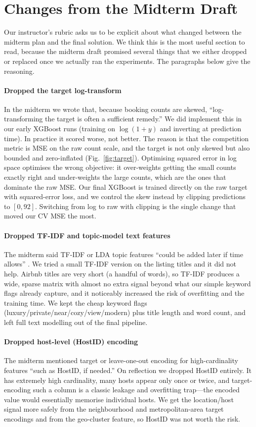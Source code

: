 \documentclass[journal]{IEEEtran}
\begin{document}
\section{Changes from the Midterm Draft}
\label{sec:changes}
Our instructor's rubric asks us to be explicit about what changed between the
midterm plan and the final solution. We think this is the most useful section to
read, because the midterm draft promised several things that we either dropped
or replaced once we actually ran the experiments. The paragraphs below give the
reasoning.

\paragraph{Dropped the target log-transform} In the midterm we wrote that,
because booking counts are skewed, ``log-transforming the target is often a
sufficient remedy.'' We did implement this in our early XGBoost runs (training on
$\log(1+y)$ and inverting at prediction time). In practice it scored worse, not
better. The reason is that the competition metric is MSE on the raw count scale,
and the target is not only skewed but also bounded and zero-inflated
(Fig.~\ref{fig:target}). Optimising squared error in log space optimises the
wrong objective: it over-weights getting the small counts exactly right and
under-weights the large counts, which are the ones that dominate the raw MSE. Our
final XGBoost is trained directly on the raw target with squared-error loss, and
we control the skew instead by clipping predictions to $[0,92]$. Switching from
log to raw with clipping is the single change that moved our CV MSE the most.

\paragraph{Dropped TF-IDF and topic-model text features} The midterm said TF-IDF
or LDA topic features ``could be added later if time allows'' \cite{islam2022}.
We tried a small TF-IDF version on the listing titles and it did not help. Airbnb
titles are very short (a handful of words), so TF-IDF produces a wide, sparse
matrix with almost no extra signal beyond what our simple keyword flags already
capture, and it noticeably increased the risk of overfitting and the training
time. We kept the cheap keyword flags
(luxury/private/near/cozy/view/modern) plus title length and word count, and left
full text modelling out of the final pipeline.

\paragraph{Dropped host-level (HostID) encoding} The midterm mentioned target or
leave-one-out encoding for high-cardinality features ``such as HostID, if
needed.'' On reflection we dropped HostID entirely. It has extremely high
cardinality, many hosts appear only once or twice, and target-encoding such a
column is a classic leakage and overfitting trap---the encoded value would
essentially memorise individual hosts. We get the location/host signal more
safely from the neighbourhood and metropolitan-area target encodings and from the
geo-cluster feature, so HostID was not worth the risk.
\end{document}
